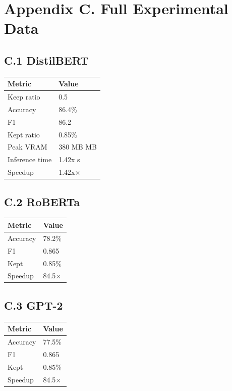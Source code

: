 
\section{Appendix C. Full Experimental Data}

\subsection{C.1 DistilBERT}

\begin{table}[H]
\centering
\small
\begin{tabular}{ll}
\toprule
\textbf{Metric} & \textbf{Value} \\
\midrule
Keep ratio & 0.5 \\
Accuracy & 86.4\% \\
F1 & 86.2 \\
Kept ratio & 0.85\% \\
Peak VRAM & 380 MB MB \\
Inference time & 1.42x s \\
Speedup & 1.42x$\times$ \\
\bottomrule
\end{tabular}
\end{table}

\subsection{C.2 RoBERTa}

\begin{table}[H]
\centering
\small
\begin{tabular}{ll}
\toprule
\textbf{Metric} & \textbf{Value} \\
\midrule
Accuracy & 78.2\% \\
F1 & 0.865 \\
Kept & 0.85\% \\
Speedup & 84.5$\times$ \\
\bottomrule
\end{tabular}
\end{table}

\subsection{C.3 GPT-2}

\begin{table}[H]
\centering
\small
\begin{tabular}{ll}
\toprule
\textbf{Metric} & \textbf{Value} \\
\midrule
Accuracy & 77.5\% \\
F1 & 0.865 \\
Kept & 0.85\% \\
Speedup & 84.5$\times$ \\
\bottomrule
\end{tabular}
\end{table}

